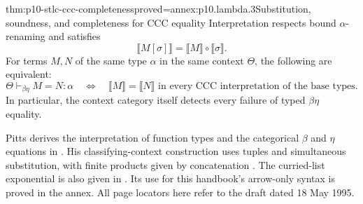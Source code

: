 \begin{hbtheorem}{thm:p10-stlc-ccc-completeness}{proved=annex:p10.lambda.3}{Substitution, soundness, and completeness for CCC equality}
Interpretation respects bound \(\alpha\)-renaming and satisfies
\[
             \llbracket M[\sigma]\rrbracket
                 =\llbracket M\rrbracket\circ\llbracket\sigma\rrbracket.
\]
For terms \(M,N\) of the same type \(\alpha\) in the same
context \(\Theta\), the following are equivalent:
\[
 \Theta\vdash_{\beta\eta}M=N:\alpha
 \quad\Longleftrightarrow\quad
 \llbracket M\rrbracket=\llbracket N\rrbracket
 \text{ in every CCC interpretation of the base types.}
\]
In particular, the context category itself detects every
failure of typed \(\beta\eta\) equality.
\end{hbtheorem}

Pitts derives the interpretation of function types and the
categorical \(\beta\) and \(\eta\) equations in
\cite[\S3.3, pp.~22--24, equations (3.19)--(3.22)]{Pitts1995Draft}.
His classifying-context construction uses tuples and
simultaneous substitution, with finite products given by
concatenation
\cite[\S4.2, pp.~30--33, Proposition~4.2.1]{Pitts1995Draft}.
The curried-list exponential is also given in
\cite[\S4.4, p.~38]{Pitts1995Draft}.
Its use for this handbook's arrow-only syntax is proved in the annex.
All page locators here refer to the draft dated 18 May 1995.
